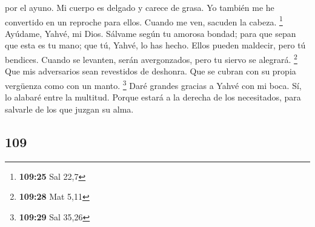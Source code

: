 \begin{paracol}{2}
por el ayuno. Mi cuerpo es delgado y carece de grasa.  Yo
también me he convertido en un reproche para ellos. Cuando me ven,
sacuden la cabeza. \footnote{\textbf{109:25} Sal 22,7} 
Ayúdame, Yahvé, mi Dios. Sálvame según tu amorosa bondad;
 para que sepan que esta es tu mano; que tú, Yahvé, lo
has hecho.  Ellos pueden maldecir, pero tú bendices.
Cuando se levanten, serán avergonzados, pero tu siervo se alegrará.
\footnote{\textbf{109:28} Mat 5,11}  Que mis adversarios
sean revestidos de deshonra. Que se cubran con su propia vergüenza como
con un manto. \footnote{\textbf{109:29} Sal 35,26}  Daré
grandes gracias a Yahvé con mi boca. Sí, lo alabaré entre la multitud.
 Porque estará a la derecha de los necesitados, para
salvarle de los que juzgan su alma.

\switchcolumn
\begin{otherlanguage}{english}

\hypertarget{section-217}{%
\section{109}\label{section-217}}


\end{otherlanguage}
\end{paracol}
